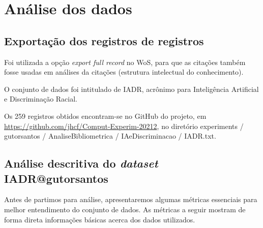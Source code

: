 \section{Análise dos dados}

\subsection{Exportação dos registros de registros}
Foi utilizada a opção \textit{export full record} no WoS, para que as citações também fosse usadas em análises da citações (estrutura intelectual do conhecimento). 

O conjunto de dados foi intitulado de IADR, acrônimo para Inteligência Artificial e Discriminação Racial.

Os 259 registros obtidos encontram-se no GitHub do projeto, em \url{https://github.com/jhcf/Comput-Experim-20212}, no diretório { experiments / gutorsantos / AnaliseBibliometrica / IAeDiscriminacao / IADR.txt}. 

\subsection{Análise descritiva do \textit{dataset} IADR@gutorsantos}

Antes de partimos para análise, apresentaremos algumas métricas essenciais para melhor entendimento do conjunto de dados. As métricas a seguir mostram de forma direta informações básicas acerca dos dados utilizados.


\newcommand\startYearIADRgutorsantos{1994}
\newcommand\finalYearIADRgutorsantos{2022}
\newcommand\totalReferencesIADRgutorsantos{12.496}
\newcommand\totalKWPlusIADRgutorsantos{625}
\newcommand\totalKWAuthorIADRgutorsantos{791}
\newcommand\totalAuthorsIADRgutorsantos{1.210}
\newcommand\totalDocumentsIADRgutorsantos{259}
\newcommand\totalSourceIADRgutorsantos{217}

